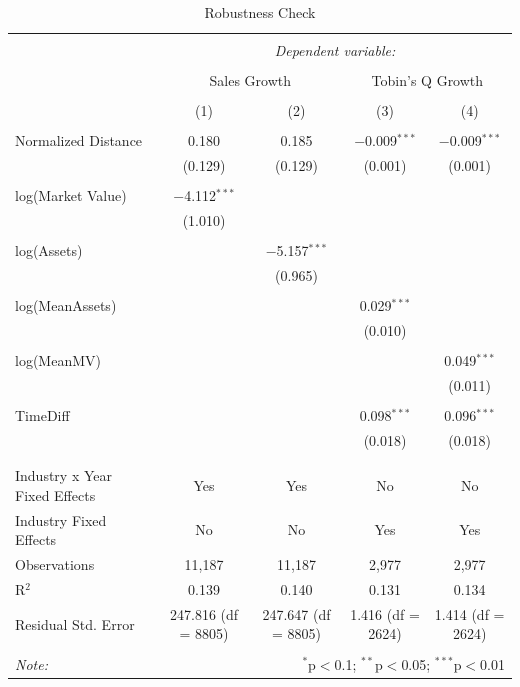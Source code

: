 \documentclass[
]{article}
\begin{document}
\begin{table}[!htbp] \centering 
  \caption{Robustness Check} 
  \label{} 
\begin{tabular}{@{\extracolsep{5pt}}lcccc} 
\\[-1.8ex]\hline 
\hline \\[-1.8ex] 
 & \multicolumn{4}{c}{\textit{Dependent variable:}} \\ 
\cline{2-5} 
\\[-1.8ex] & \multicolumn{2}{c}{Sales Growth} & \multicolumn{2}{c}{Tobin's Q Growth} \\ 
\\[-1.8ex] & (1) & (2) & (3) & (4)\\ 
\hline \\[-1.8ex] 
 Normalized Distance & 0.180 & 0.185 & $-$0.009$^{***}$ & $-$0.009$^{***}$ \\ 
  & (0.129) & (0.129) & (0.001) & (0.001) \\ 
  & & & & \\ 
 log(Market Value) & $-$4.112$^{***}$ &  &  &  \\ 
  & (1.010) &  &  &  \\ 
  & & & & \\ 
 log(Assets) &  & $-$5.157$^{***}$ &  &  \\ 
  &  & (0.965) &  &  \\ 
  & & & & \\ 
 log(MeanAssets) &  &  & 0.029$^{***}$ &  \\ 
  &  &  & (0.010) &  \\ 
  & & & & \\ 
 log(MeanMV) &  &  &  & 0.049$^{***}$ \\ 
  &  &  &  & (0.011) \\ 
  & & & & \\ 
 TimeDiff &  &  & 0.098$^{***}$ & 0.096$^{***}$ \\ 
  &  &  & (0.018) & (0.018) \\ 
  & & & & \\ 
\hline \\[-1.8ex] 
Industry x Year Fixed Effects & Yes & Yes & No & No \\ 
Industry Fixed Effects & No & No & Yes & Yes \\ 
Observations & 11,187 & 11,187 & 2,977 & 2,977 \\ 
R$^{2}$ & 0.139 & 0.140 & 0.131 & 0.134 \\ 
Residual Std. Error & 247.816 (df = 8805) & 247.647 (df = 8805) & 1.416 (df = 2624) & 1.414 (df = 2624) \\ 
\hline 
\hline \\[-1.8ex] 
\textit{Note:}  & \multicolumn{4}{r}{$^{*}$p$<$0.1; $^{**}$p$<$0.05; $^{***}$p$<$0.01} \\ 
\end{tabular} 
\end{table}
\end{document}
